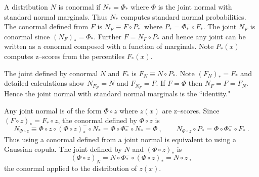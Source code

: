 \documentclass[useAMS,usenatbib,referee]{article}
\newcommand{\cq}{\ , \qquad}
\begin{document}
A distribution $N$ is conormal if  $N_*=\Phi_*$ where $\Phi$ is the joint normal with standard normal marginals.
Thus $N_*$ computes standard normal probabilities.  The  conormal defined from  $F$ is
$
N_F \equiv  F\circ P_*^-$ where $P_* =\Phi_*^-\circ F_*$.  The joint $N_F$ is conormal since $(N_F)_*=\Phi_*$.   Further $F=N_F\circ P_*$ and hence any joint can be written as a conormal composed with a function of marginals.  Note
$P_*(x)$ computes z--scores  from the percentiles $F_*(x)$. 

The joint defined by conormal $N$ and $F_*$ is 
$
F_N \equiv N\circ P_*
$.
Note $(F_N)_*= F_*$ and detailed calculations show 
$
N_{F_N} =N
$ and $
F_{N_F} = F
$.
If $F=\Phi$ then $N_F = F=F_N$.  Hence the joint normal with standard normal marginals is the ``identity."

Any joint normal is of the form $\Phi\circ z$ where  $z(x)$ are z--scores.   Since  $
(F\circ z)_* = F_*\circ z$,  the conormal defined by $\Phi\circ z$ is
$$
N_{\Phi\circ z} \equiv  \Phi\circ z\circ (\Phi\circ z)_*^-\circ N_*=\Phi\circ\Phi_*^-\circ N_*=\Phi \cq N_{\Phi\circ z} \circ P_* = \Phi\circ\Phi_*^-\circ F_*\ .
$$
Thus using a conormal defined from a joint normal is equivalent to using a Gaussian copula.
The joint defined by $N$ and  $(\Phi\circ z)_*$ is
$$
(\Phi\circ z)_N = N\circ \Phi_*^-\circ (\Phi\circ z)_* = N\circ z\ , 
$$
the conormal applied to the distribution of  $z(x)$.
\end{document}
